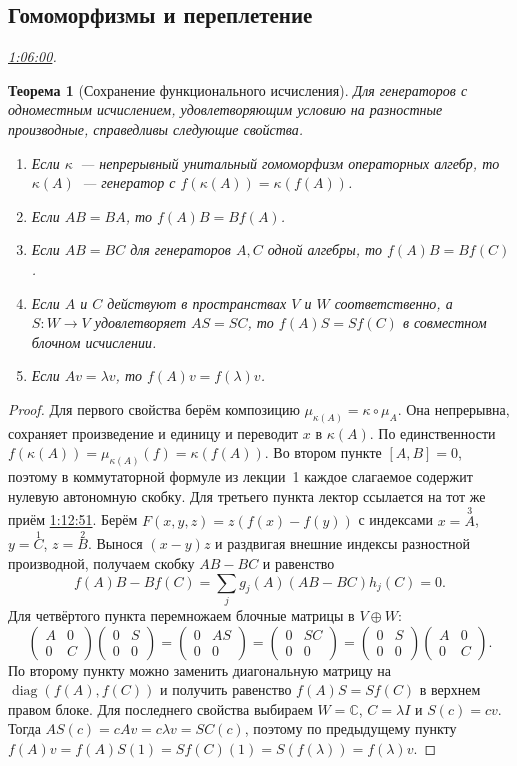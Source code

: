 \documentclass[11pt,a4paper]{article}
\theoremstyle{plain}
\newtheorem{theorem}{Теорема}[section]
\theoremstyle{definition}
\newcommand{\CC}{\mathbb C}
\newcommand{\id}{I}
\newcommand{\at}[3]{\href{https://www.youtube.com/watch?v=#1&t=#2s}{#3}}
\newcommand{\topic}[2]{\Needspace{5\baselineskip}\subsection*{#1}\noindent\emph{#2.}\par\nobreak\smallskip}
\begin{document}
\topic{Гомоморфизмы и переплетение}{\at{8kQuUxC-VVg}{3960}{1:06:00}}
\begin{theorem}[Сохранение функционального исчисления]
Для генераторов с одноместным исчислением, удовлетворяющим
условию на разностные производные, справедливы следующие свойства.
\begin{enumerate}
\item Если $\kappa$~--- непрерывный унитальный гомоморфизм
операторных алгебр, то $\kappa(A)$~--- генератор с
$f(\kappa(A))=\kappa(f(A))$.
\item Если $AB=BA$, то $f(A)B=Bf(A)$.
\item Если $AB=BC$ для генераторов $A,C$ одной алгебры,
то $f(A)B=Bf(C)$.
\item Если $A$ и $C$ действуют в пространствах $V$ и $W$
соответственно, а $S:W\to V$ удовлетворяет $AS=SC$, то
$f(A)S=Sf(C)$ в совместном блочном исчислении.
\item Если $Av=\lambda v$, то $f(A)v=f(\lambda)v$.
\end{enumerate}
\end{theorem}
\begin{proof}
Для первого свойства берём композицию
$\mu_{\kappa(A)}=\kappa\circ\mu_A$. Она непрерывна,
сохраняет произведение и единицу и переводит $x$ в
$\kappa(A)$. По единственности
$f(\kappa(A))=\mu_{\kappa(A)}(f)=\kappa(f(A))$.
Во втором пункте $[A,B]=0$, поэтому в коммутаторной
формуле из лекции~1 каждое слагаемое содержит нулевую
автономную скобку. Для третьего пункта лектор ссылается
на тот же приём \at{8kQuUxC-VVg}{4371}{1:12:51}.
Берём
$F(x,y,z)=z(f(x)-f(y))$ с индексами $x=\overset{3}{A}$,
$y=\overset{1}{C}$, $z=\overset{2}{B}$. Вынося
$(x-y)z$ и раздвигая внешние индексы разностной
производной, получаем скобку $AB-BC$ и равенство
\[
 f(A)B-Bf(C)=\sum_j g_j(A)(AB-BC)h_j(C)=0.
\]
Для четвёртого пункта перемножаем блочные матрицы
в $V\oplus W$:
\[
 \begin{pmatrix}A&0\\0&C\end{pmatrix}
 \begin{pmatrix}0&S\\0&0\end{pmatrix}
 =\begin{pmatrix}0&AS\\0&0\end{pmatrix}
 =\begin{pmatrix}0&SC\\0&0\end{pmatrix}
 =\begin{pmatrix}0&S\\0&0\end{pmatrix}
 \begin{pmatrix}A&0\\0&C\end{pmatrix}.
\]
По второму пункту можно заменить диагональную матрицу
на $\operatorname{diag}(f(A),f(C))$ и получить равенство
$f(A)S=Sf(C)$ в верхнем правом блоке.
Для последнего свойства выбираем $W=\CC$, $C=\lambda\id$
и $S(c)=cv$. Тогда $AS(c)=cAv=c\lambda v=SC(c)$,
поэтому по предыдущему пункту
$f(A)v=f(A)S(1)=Sf(C)(1)=S(f(\lambda))=f(\lambda)v$.
\end{proof}
\end{document}
